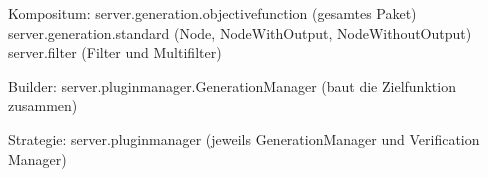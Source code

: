 Kompositum:
	server.generation.objectivefunction (gesamtes Paket)
	server.generation.standard (Node, NodeWithOutput, NodeWithoutOutput)
	server.filter (Filter und Multifilter)

Builder:
	server.pluginmanager.GenerationManager (baut die Zielfunktion zusammen)
	

Strategie:
	server.pluginmanager (jeweils GenerationManager und Verification Manager)